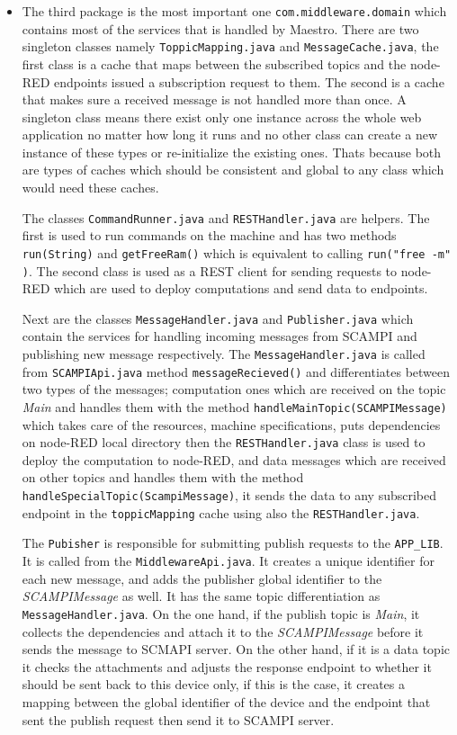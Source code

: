 \begin{itemize}
 
 \item The third package is the most important one \verb|com.middleware.domain| which contains most of the services that is handled by Maestro. There are two singleton classes namely \verb|ToppicMapping.java| and \verb|MessageCache.java|, the first class is a cache that maps between the subscribed topics and the node-RED endpoints issued a subscription request to them. The second is a cache that makes sure a received message is not handled more than once. A singleton class means there exist only one instance across the whole web application no matter how long it runs and no other class can create a new instance of these types or re-initialize the existing ones. Thats because both are types of caches which should be consistent and global to any class which would need these caches. 
 
 The classes \verb|CommandRunner.java| and \verb|RESTHandler.java| are helpers. The first is used to run commands on the machine and  has two methods \verb|run(String)| and \verb|getFreeRam()| which is equivalent to calling \verb|run("free -m" )|. The second class is used as a REST client for sending requests to node-RED which are used to deploy computations and  send data to endpoints.
 
  Next are the classes \verb|MessageHandler.java| and \verb|Publisher.java| which contain the services for handling incoming messages from SCAMPI and publishing new message respectively. The \verb|MessageHandler.java| is called from  \verb|SCAMPIApi.java| method \verb|messageRecieved()| and differentiates between two types of the messages; computation ones which are received on the topic \textit{Main} and handles them with the method \verb|handleMainTopic(SCAMPIMessage)| which takes care of the resources, machine specifications, puts dependencies on node-RED local directory then the \verb|RESTHandler.java| class is used to deploy the computation to node-RED, and data messages which are received on other topics and handles them with the method \verb|handleSpecialTopic(ScampiMessage)|, it sends the data to any subscribed endpoint in the \verb|toppicMapping| cache using also the \verb|RESTHandler.java|.
 
 The \verb|Pubisher| is responsible for submitting publish requests to the \verb|APP_LIB|. It is called from the \verb|MiddlewareApi.java|.  It creates a unique identifier for each new message, and adds the publisher global identifier to the \textit{SCAMPIMessage} as well. It has the same topic differentiation as \verb|MessageHandler.java|.
 On the one hand, if the publish topic is \textit{Main}, it collects the dependencies and attach it to the \textit{SCAMPIMessage} before it sends the message to SCMAPI server. On the other hand, if it is a data topic it checks the attachments and adjusts the response endpoint  to whether it should be sent back to this device only, if this is the case, it creates a mapping between the global identifier of the device and the endpoint that sent the publish request then send it to SCAMPI server. \\
 

\end{itemize}
